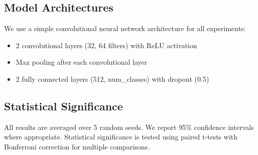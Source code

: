 \documentclass{article}
\begin{document}
\subsection{Model Architectures}

We use a simple convolutional neural network architecture for all experiments:
\begin{itemize}
    \item 2 convolutional layers (32, 64 filters) with ReLU activation
    \item Max pooling after each convolutional layer
    \item 2 fully connected layers (512, num\_classes) with dropout (0.5)
\end{itemize}

\subsection{Statistical Significance}

All results are averaged over 5 random seeds. We report 95\% confidence intervals where appropriate. Statistical significance is tested using paired t-tests with Bonferroni correction for multiple comparisons.
\end{document}
